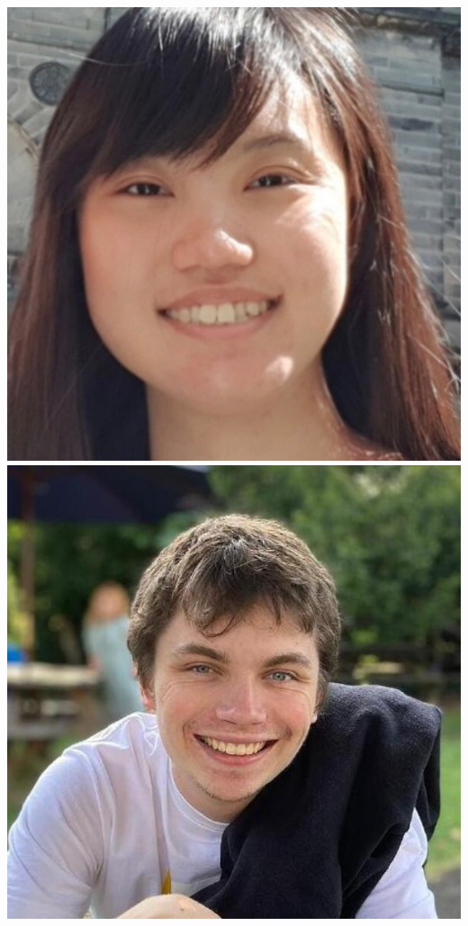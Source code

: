 \documentclass[aspectratio=169]{beamer}
\begin{document}
\begin{frame}
{        \includegraphics[width=0.09\textheight]{people/dily_ong.jpg}%
        \includegraphics[width=0.09\textheight]{people/harry_bevins.jpg}%
}
\end{frame}
\end{document}
